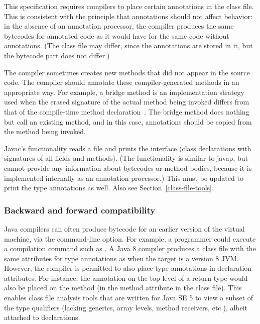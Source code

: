 \documentclass[10pt]{article}
\begin{document}
This specification requires compilers to place certain annotations
in the class file.  This is consistent with the principle that annotations
should not affect behavior:  in the absence of an annotation processor, the
compiler produces the same bytecodes for annotated code as it would have
for the same code without annotations.  (The class file may differ, since
the annotations are stored in it, but the bytecode part does not differ.)

The compiler sometimes creates new methods that did not appear in the
source code.  The compiler should annotate these compiler-generated methods
in an appropriate way.  For example, a bridge method is an implementation
strategy used when the erased signature of the actual method being invoked
differs from that of the compile-time method
declaration~\cite[\S15.12.4.5]{GoslingJSB2005}.  The bridge method does
nothing but call an existing method, and in this case, annotations should
be copied from the method being invoked.



Javac's  functionality reads a  file and prints
the interface (class declarations with signatures of all fields and
methods).  (The  functionality is similar to javap, but
cannot provide
any information about bytecodes or method bodies, because it is implemented
internally as an annotation processor.)
This must be updated to print the type annotations as well.
Also see Section~\ref{class-file-tools}.



\subsubsection{Backward and forward compatibility\label{mods-compatibility}}

Java compilers can often produce bytecode for an earlier version of the
virtual machine, via the  command-line option.  For example,
a programmer could execute a compilation command such as .  A Java 8 compiler produces a class file
with the same attributes for type annotations as when the target is a
version 8 JVM\@.  However, the compiler is permitted to also place type
annotations in declaration attributes.  For instance, the annotation on the
top level of a return type would also be placed on the method (in the
method attribute in the class file).  This enables class file analysis
tools that are written for Java SE 5 to view a subset of the type
qualifiers (lacking generics, array levels, method receivers, etc.), albeit
attached to declarations.
\end{document}
